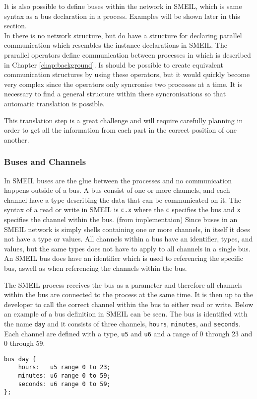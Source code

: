 It is also possible to define buses within the network in SMEIL, which is same syntax as a bus declaration in a process. Examples will be shown later in this section.\\

In \cspm{} there is no network structure, but \cspm{} do have a structure for declaring parallel communication which resembles the instance declarations in SMEIL. The prarallel operators define communication between processes in \cspm{} which is described in Chapter \ref{chap:background}. Is should be possible to create equivalent communication structures by using these operators, but it would quickly become very complex since the operators only syncronise two processes at a time. It is necessary to find a general structure within these syncronisations so that automatic translation is possible.

This translation step is a great challenge and will require carefully planning in order to get all the information from each part in the correct position of one another.

\subsubsection{Buses and Channels}
In SMEIL buses are the glue between the processes and no communication happens outside of a bus. A bus consist of one or more channels, and each channel have a type describing the data that can be communicated on it.
The syntax of a read or write in SMEIL is \texttt{c.x} where the \texttt{c} specifies the bus and \texttt{x} specifies the channel within the bus.
(from implementaion)
Since buses in an SMEIL network is simply shells containing one or more channels, in itself it does not have a type or values. All channels within a bus have an identifier, types, and values, but the same types does not have to apply to all channels in a single bus. An SMEIL bus does have an identifier which is used to referencing the specific bus, aswell as when referencing the channels within the bus.

The SMEIL process receives the bus as a parameter and therefore all channels within the bus are connected to the process at the same time. It is then up to the developer to call the correct channel within the bus to either read or write.
Below an example of a bus definition in SMEIL can be seen. The bus is identified with the name \texttt{day} and it consists of three channels, \texttt{hours}, \texttt{minutes}, and \texttt{seconds}. Each channel are defined with a type, \texttt{u5} and \texttt{u6} and a range of 0 through 23 and 0 through 59.
\begin{verbatim}
bus day {
    hours:   u5 range 0 to 23;
    minutes: u6 range 0 to 59;
    seconds: u6 range 0 to 59;
};
\end{verbatim}

